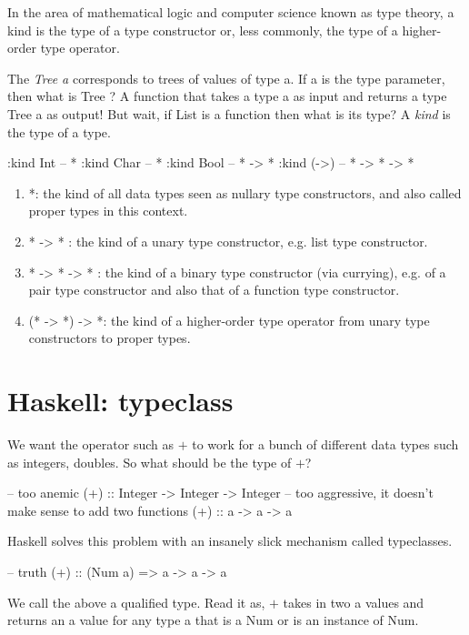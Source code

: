 In the area of mathematical logic and computer science known as type theory, 
a kind is the type of a type constructor or, less commonly, the type of a higher-order type operator. 

The \textit{Tree a} corresponds to trees of values of type a. 
If a is the type parameter, then what is Tree ? 
A function that takes a type a as input and returns a type Tree a as output! 
But wait, if List is a function then what is its type? A \textit{kind} is the type of a type.

\begin{haskellcode}
:kind Int -- *
:kind Char -- *
:kind Bool -- * -> *
:kind (->) -- * -> * -> *
\end{haskellcode}

\begin{enumerate}
    \item *: the kind of all data types seen as nullary type constructors, 
    and also called proper types in this context.
    \item * -> * : the kind of a unary type constructor, e.g. list type constructor.
    \item * -> * -> * : the kind of a binary type constructor (via currying), e.g. of 
             a pair type constructor  and also that of a function type constructor.
    \item (* -> *) -> *: the kind of a higher-order type operator from unary type constructors to proper types.
\end{enumerate}


\section{Haskell: typeclass}
We want the operator such as $+$ to work for a bunch of different data types
such as integers, doubles. So what should be the type of $+$?

\begin{haskellcode}
-- too anemic
(+) :: Integer -> Integer -> Integer
-- too aggressive, it doesn’t make sense to add two functions
(+) :: a -> a -> a
\end{haskellcode}

Haskell solves this problem with an insanely slick mechanism called typeclasses.

\begin{haskellcode}
-- truth
(+) :: (Num a) => a -> a -> a
\end{haskellcode}
We call the above a qualified type. Read it as, $+$ takes in two a values and returns an a value 
for any type a that is a Num or is an instance of Num.

